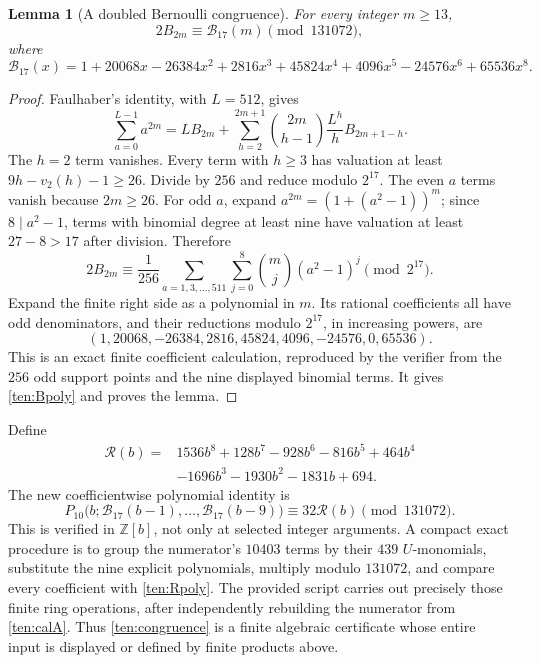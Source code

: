 \documentclass[11pt]{article}
\newtheorem{lemma}[theorem]{Lemma}
\theoremstyle{definition}
\theoremstyle{remark}
\numberwithin{equation}{section}
\begin{document}
\begin{lemma}[A doubled Bernoulli congruence]\label{ten:B17}
For every integer $m\ge13$,
\[
 2B_{2m}\equiv\mathcal B_{17}(m)\pmod{131072},
\]
where
\begin{equation}\label{ten:Bpoly}
 \mathcal B_{17}(x)=1+20068x-26384x^2+2816x^3+45824x^4
             +4096x^5-24576x^6+65536x^8.
\end{equation}
\end{lemma}
\begin{proof}
Faulhaber's identity, with $L=512$, gives
\[
 \sum_{a=0}^{L-1}a^{2m}
 =LB_{2m}+\sum_{h=2}^{2m+1}
      \binom{2m}{h-1}\frac{L^h}{h}B_{2m+1-h}.
\]
The $h=2$ term vanishes.  Every term with $h\ge3$ has valuation
at least $9h-v_2(h)-1\ge26$.  Divide by $256$ and reduce modulo
$2^{17}$.  The even $a$ terms vanish because $2m\ge26$.
For odd $a$, expand
$a^{2m}=(1+(a^2-1))^m$; since $8\mid a^2-1$, terms with
binomial degree at least nine have valuation at least $27-8>17$
after division.  Therefore
\begin{equation}\label{ten:finite-average}
 2B_{2m}\equiv\frac1{256}
 \sum_{a=1,3,\ldots,511}\sum_{j=0}^{8}
          \binom mj(a^2-1)^j\pmod{2^{17}}.
\end{equation}
Expand the finite right side as a polynomial in $m$.  Its rational
coefficients all have odd denominators, and their reductions modulo
$2^{17}$, in increasing powers, are
\[
 (1,20068,-26384,2816,45824,4096,-24576,0,65536).
\]
This is an exact finite coefficient calculation, reproduced by the
verifier from the $256$ odd support points and the nine displayed
binomial terms.  It gives \eqref{ten:Bpoly} and proves the lemma.
\end{proof}

Define
\begin{equation}\label{ten:Rpoly}
 \begin{split}
 \mathcal R(b)={}&1536b^8+128b^7-928b^6-816b^5+464b^4\\
                 &-1696b^3-1930b^2-1831b+694.
 \end{split}
\end{equation}
The new coefficientwise polynomial identity is
\begin{equation}\label{ten:congruence}
 P_{10}\bigl(b;\mathcal B_{17}(b-1),\ldots,
                    \mathcal B_{17}(b-9)\bigr)
       \equiv32\mathcal R(b)\pmod{131072}.
\end{equation}
This is verified in $\mathbb Z[b]$, not only at selected integer
arguments.  A compact exact procedure is to group the numerator's
$10403$ terms by their $439$ $U$-monomials, substitute the nine
explicit polynomials, multiply modulo $131072$, and compare every
coefficient with \eqref{ten:Rpoly}.  The provided script carries
out precisely those finite ring operations, after independently
rebuilding the numerator from \eqref{ten:calA}.  Thus
\eqref{ten:congruence} is a finite algebraic certificate whose
entire input is displayed or defined by finite products above.
\end{document}
